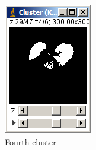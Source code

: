 \documentclass[11pt]{article} %
\begin{document}
\begin{figure}
\begin{subfigure}[b]{0.3\textwidth}
                \includegraphics[width=\textwidth]{figures/k-means_results_4}
                \caption{Fourth cluster}
                \label{fig:k-means_res_4}
	\end{subfigure}%
	 ~
        \begin{subfigure}[b]{0.3\textwidth}
                \centering

\end{subfigure}
\end{figure}
\end{document}
